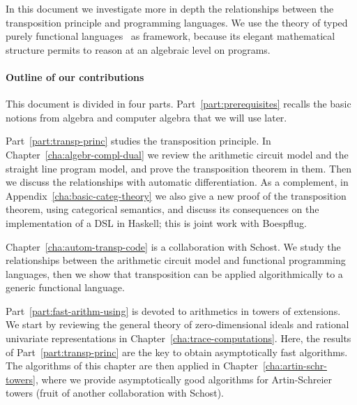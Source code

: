 In this document we investigate more in depth the relationships
between the transposition principle and programming languages. We use
the theory of typed purely functional languages~\cite{pierce} as
framework, because its elegant mathematical structure permits to
reason at an algebraic level on programs.


\paragraph*{Outline of our contributions}
This document is divided in four parts. Part~\ref{part:prerequisites}
recalls the basic notions from algebra and computer algebra that we
will use later.

Part~\ref{part:transp-princ} studies the transposition principle. In
Chapter~\ref{cha:algebr-compl-dual} we review the arithmetic circuit
model and the straight line program model, and prove the transposition
theorem in them. Then we discuss the relationships with automatic
differentiation. As a complement, in
Appendix~\ref{cha:basic-categ-theory} we also give a new proof of the
transposition theorem, using categorical semantics, and discuss its
consequences on the implementation of a DSL in Haskell; this is joint
work with Boespflug.

Chapter~\ref{cha:autom-transp-code} is a collaboration with Schost. We
study the relationships between the arithmetic circuit model and
functional programming languages, then we show that transposition can
be applied algorithmically to a generic functional language. 

Part~\ref{part:fast-arithm-using} is devoted to arithmetics in towers
of extensions. We start by reviewing the general theory of
zero-dimensional ideals and rational univariate representations in
Chapter~\ref{cha:trace-computations}. Here, the results of
Part~\ref{part:transp-princ} are the key to obtain asymptotically fast
algorithms. The algorithms of this chapter are then applied in
Chapter~\ref{cha:artin-schr-towers}, where we provide asymptotically
good algorithms for Artin-Schreier towers (fruit of another
collaboration with Schost).

